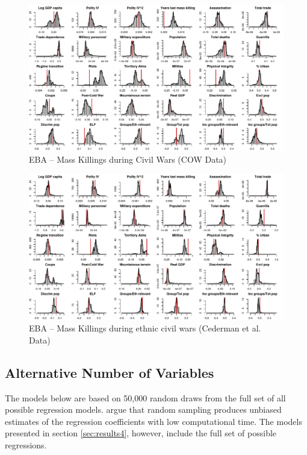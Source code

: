 \documentclass[a4paper,12pt]{article}
\begin{document}
\begin{figure}
    \centering
    \includegraphics[width=.98\textheight,angle=90]{images/mk-cow.pdf}
    \caption{EBA -- Mass Killings during Civil Wars (COW Data)}
    \label{fig:mk-cow}
\end{figure}

\begin{figure}
    \centering
    \includegraphics[width=.98\textheight,angle=90]{images/mk-eth.pdf}
    \caption{EBA -- Mass Killings during ethnic civil wars (Cederman et al. Data)}
    \label{fig:mk-eth}
\end{figure}

\subsection{Alternative Number of Variables}

The models below are based on 50,000 random draws from the full set of all possible regression models. \citet[819]{salaimartin2004determinants} argue that random sampling produces unbiased estimates of the regression coefficients with low computational time. The models presented in section \ref{sec:results4}, however, include the full set of possible regressions.
\end{document}
